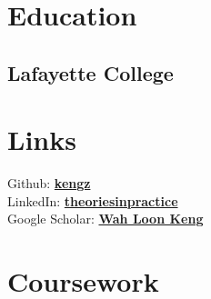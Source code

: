 \documentclass{deedy-resume-openfont}
\begin{document}
%
%
\lastupdated

%
%

%
%

\begin{minipage}[t]{0.33\textwidth} 


\section{Education} 

\subsection{Lafayette College}
\sectionsep



\section{Links} 
Github: \href{https://github.com/kengz}{\bf kengz} \\
LinkedIn:  \href{https://www.linkedin.com/in/theoriesinpractice}{\bf theoriesinpractice} \\
Google Scholar: \href{https://scholar.google.com/citations?user=J0aM_cEAAAAJ&hl=en}{\bf Wah Loon Keng}
\sectionsep


\section{Coursework}

\end{minipage}
\end{document}
